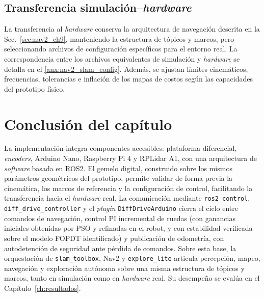 \subsection{Transferencia simulación--\texorpdfstring{\textit{hardware}}{hardware}}
\label{sec:integracion_ciclo}

La transferencia al \textit{hardware} conserva la arquitectura de navegación
descrita en la Sec.~\ref{sec:nav2_ch9}, manteniendo la estructura de tópicos
y marcos, pero seleccionando archivos de configuración específicos para el
entorno real. La correspondencia entre los archivos equivalentes de
simulación y \textit{hardware} se detalla en el \ref{anx:nav2_slam_config}. Además, se ajustan límites cinemáticos,
frecuencias, tolerancias e inflación de los mapas de costos según las
capacidades del prototipo físico.

\section*{Conclusión del capítulo}
\label{sec:conclusion_ch9}

La implementación integra componentes accesibles: plataforma diferencial, \textit{encoders}, \gls{Arduino} Nano, Raspberry Pi 4 y RPLidar A1, con una arquitectura de \textit{software} basada en \gls{ROS2}. El gemelo digital, construido sobre los mismos parámetros geométricos del prototipo, permite validar de forma previa la cinemática, los marcos de referencia y la configuración de control, facilitando la transferencia hacia el \textit{hardware} real. La comunicación mediante \texttt{ros2\_control}, \texttt{diff\_drive\_controller} y el \textit{plugin} \texttt{DiffDriveArduino} cierra el ciclo entre comandos de navegación, control PI incremental de ruedas (con ganancias iniciales obtenidas por PSO y refinadas en el robot, y con estabilidad verificada sobre el modelo FOPDT identificado) y publicación de odometría, con autodetención de seguridad ante pérdida de comandos. Sobre esta base, la orquestación de \texttt{slam\_toolbox}, Nav2 y \texttt{explore\_lite} articula percepción, mapeo, navegación y exploración autónoma sobre una misma estructura de tópicos y marcos, tanto en simulación como en \textit{hardware} real. Su desempeño se evalúa en el Capítulo~\ref{ch:resultados}.
